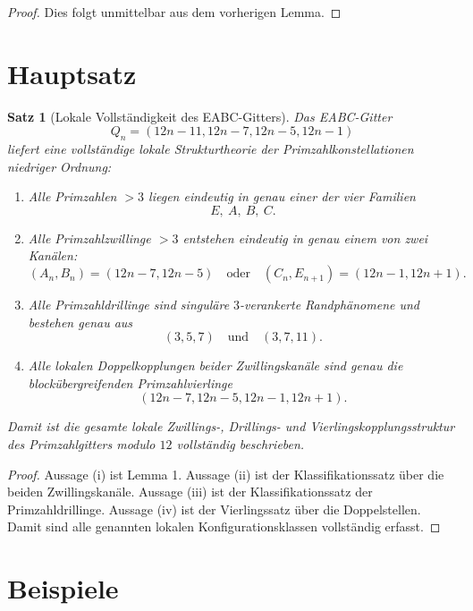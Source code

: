 \documentclass[11pt,a4paper]{article}
\newtheorem{satz}{Satz}
\theoremstyle{definition}
\theoremstyle{remark}
\begin{document}
	\begin{proof}
		Dies folgt unmittelbar aus dem vorherigen Lemma.
	\end{proof}
	
	\section{Hauptsatz}
	
	\begin{satz}[Lokale Vollständigkeit des EABC-Gitters]
		Das EABC-Gitter
		\[
		Q_n=(12n-11,12n-7,12n-5,12n-1)
		\]
		liefert eine vollständige lokale Strukturtheorie der Primzahlkonstellationen niedriger Ordnung:
		
		\begin{enumerate}[label=\textup{(\roman*)}]
			\item Alle Primzahlen \(>3\) liegen eindeutig in genau einer der vier Familien
			\[
			E,\ A,\ B,\ C.
			\]
			
			\item Alle Primzahlzwillinge \(>3\) entstehen eindeutig in genau einem von zwei Kanälen:
			\[
			(A_n,B_n)=(12n-7,12n-5)
			\quad\text{oder}\quad
			(C_n,E_{n+1})=(12n-1,12n+1).
			\]
			
			\item Alle Primzahldrillinge sind singuläre \(3\)-verankerte Randphänomene und bestehen genau aus
			\[
			(3,5,7)
			\quad\text{und}\quad
			(3,7,11).
			\]
			
			\item Alle lokalen Doppelkopplungen beider Zwillingskanäle sind genau die blockübergreifenden
			Primzahlvierlinge
			\[
			(12n-7,12n-5,12n-1,12n+1).
			\]
		\end{enumerate}
		
		Damit ist die gesamte lokale Zwillings-, Drillings- und Vierlingskopplungsstruktur des
		Primzahlgitters modulo \(12\) vollständig beschrieben.
	\end{satz}
	
	\begin{proof}
		Aussage \textup{(i)} ist Lemma 1. Aussage \textup{(ii)} ist der Klassifikationssatz über die
		beiden Zwillingskanäle. Aussage \textup{(iii)} ist der Klassifikationssatz der Primzahldrillinge.
		Aussage \textup{(iv)} ist der Vierlingssatz über die Doppelstellen. Damit sind alle genannten
		lokalen Konfigurationsklassen vollständig erfasst.
	\end{proof}
	
	\section{Beispiele}
	
\end{document}
